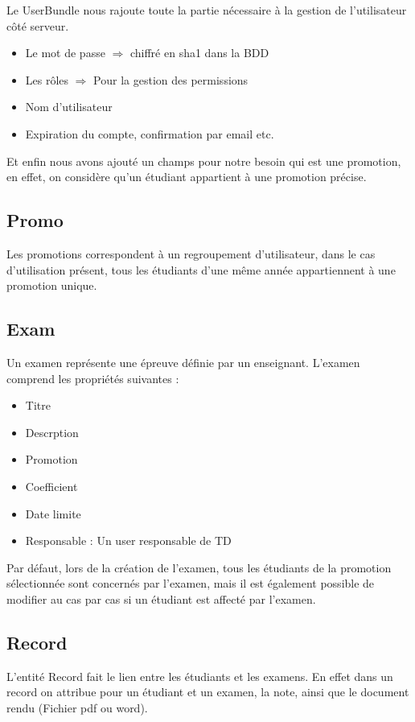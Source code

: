 \documentclass{report}
\begin{document}
      Le UserBundle nous rajoute toute la partie nécessaire à la gestion de
      l'utilisateur côté serveur.
      \begin{itemize}
        \item{Le mot de passe $\Rightarrow$ chiffré en sha1 dans la BDD}
        \item{Les rôles $\Rightarrow$ Pour la gestion des permissions}
        \item{Nom d'utilisateur}
        \item{Expiration du compte, confirmation par email etc.}
      \end{itemize}

      Et enfin nous avons ajouté un champs pour notre besoin qui est une
      promotion, en effet, on considère qu'un étudiant appartient à une
      promotion précise.

    \subsection{Promo}
      Les promotions correspondent à un regroupement d'utilisateur, dans le
      cas d'utilisation présent, tous les étudiants d'une même année 
      appartiennent à une promotion unique.

    \subsection{Exam}
      Un examen représente une épreuve définie par un enseignant. L'examen 
			comprend les propriétés suivantes :
			\begin{itemize}
				\item{Titre}
				\item{Descrption}
				\item{Promotion}
				\item{Coefficient}
				\item{Date limite}
				\item{Responsable : Un user responsable de TD}
			\end{itemize}
			Par défaut, lors de la création de l'examen, tous les étudiants de la
			promotion sélectionnée sont concernés par l'examen, mais il est également possible
			de modifier au cas par cas si un étudiant est affecté par l'examen.
    \subsection{Record}
			L'entité Record fait le lien entre les étudiants et les examens. En effet dans un record
			on attribue pour un étudiant et un examen, la note, ainsi que le document rendu 
			(Fichier pdf ou word).
\end{document}
